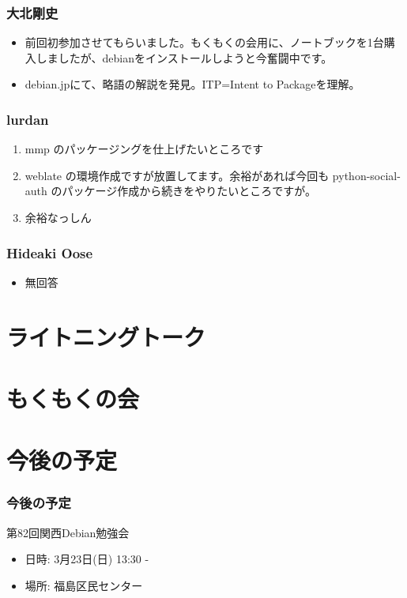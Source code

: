 \documentclass[cjk,dvipdfmx,10pt,compress,%
hyperref={bookmarks=true,bookmarksnumbered=true,bookmarksopen=false,%
colorlinks=false,%
pdftitle={第 81 回 関西 Debian 勉強会},%
pdfauthor={倉敷・のがた・佐々木・かわだ・八津尾},%
pdfsubject={資料},%
}]{beamer}
\begin{document}
\begin{frame}
  \frametitle{ 大北剛史 }
    \begin{itemize}
    \item 前回初参加させてもらいました。もくもくの会用に、ノートブックを1台購入しましたが、debianをインストールしようと今奮闘中です。
    \item debian.jpにて、略語の解説を発見。ITP=Intent to Packageを理解。
    \end{itemize}
\end{frame}

\begin{frame}
  \frametitle{ lurdan }
  \begin{enumerate}
  \item mmp のパッケージングを仕上げたいところです
  \item weblate の環境作成ですが放置してます。余裕があれば今回も python-social-auth のパッケージ作成から続きをやりたいところですが。
  \item 余裕なっしん
  \end{enumerate}
\end{frame}

\begin{frame}
  \frametitle{ Hideaki Oose }
    \begin{itemize}
    \item 無回答
    \end{itemize}
\end{frame}


\section{ライトニングトーク}


\section{もくもくの会}


\section{今後の予定}
\begin{frame}[fragile]
\frametitle{今後の予定}

\begin{block}{第82回関西Debian勉強会}
  \begin{itemize}
  \item 日時: 3月23日(日) 13:30 -
  \item 場所: 福島区民センター
  \end{itemize}
\end{block}

\end{frame}

\takahashi[50]{  }
\end{document}
